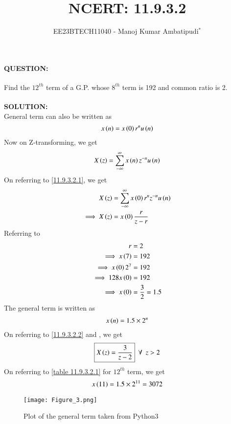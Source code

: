 \documentclass[journal,12pt,twocolumn]{IEEEtran}
\theoremstyle{remark}
\begin{document}

\vspace{3cm}
\title{NCERT: 11.9.3.2}
\author{EE23BTECH11040 - Manoj Kumar Ambatipudi$^{*}$%
}
\maketitle
\newpage
\bigskip
\renewcommand{\thefigure}{\theenumi}
\renewcommand{\thetable}{\theenumi}
\textbf{QUESTION:}\\\\
Find the $12^{th}$ term of a G.P. whose $8^{th}$ term is 192 and common ratio is 2.\\\\
\textbf{SOLUTION:}\\
General term can also be written as 
\begin{align}
    x\left(n\right)=x\left(0\right)r^{n}u\left(n\right)\label{11.9.3.2.1}
\end{align}
Now on Z-transforming, we get
\begin{align}
    X\left(z\right)=\sum_{-\infty}^{\infty}x\left(n\right)z^{-n}u\left(n\right)
\end{align}      
On referring to \ref{11.9.3.2.1}, we get
\begin{align}
X\left(z\right)&=\sum_{-\infty}^{\infty}x\left(0\right)r^{n}z^{-n}u\left(n\right)\\
\implies X\left(z\right)&=x\left(0\right)\dfrac{r}{z-r}\label{11.9.3.2.2}
\end{align}
Referring to 
\begin{align}
                     r&=2\\
\implies     x\left(7\right)&=192\\
\implies x\left(0\right)2^{7}&=192\\
\implies 128x\left(0\right)&=192\\
\implies x\left(0\right)&=\dfrac{3}{2}=1.5
\end{align}
The general term is written as
\begin{align}
    x\left(n\right)=1.5\times2^{n}
\end{align}
On referring to \eqref{11.9.3.2.2} and , we get
\begin{align}
   \boxed{X\left(z\right)=\dfrac{3}{z-2}}\,\,\, \forall \,\,\, z>2
\end{align}
On referring to \ref{table 11.9.3.2.1} for $12^{th}$ term, we get
\begin{align}
x\left(11\right) = 1.5\times2^{11} = 3072
\end{align}
\begin{figure}[h]
\renewcommand\thefigure{1} 
    \centering
    \texttt{[image: Figure\_3.png]}
    \caption{Plot of the general term taken from Python3}
    \label{fig:1}
\end{figure}\\
\end{document}
